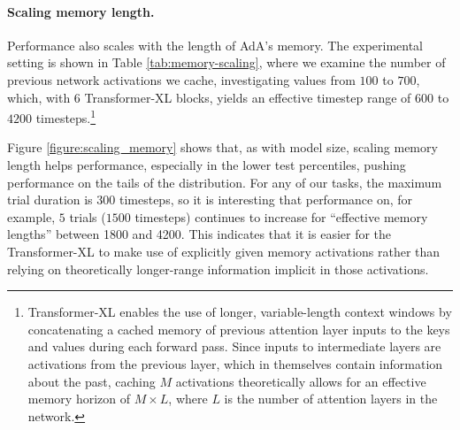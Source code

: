 \paragraph{Scaling memory length.}

Performance also scales with the length of AdA's memory. The experimental setting is shown in Table \ref{tab:memory-scaling}, where we examine the number of previous network activations we cache, investigating values from $100$ to $700$, which, with $6$ Transformer-XL blocks, yields an effective timestep range of $600$ to $4200$ timesteps.\footnote{Transformer-XL enables the use of longer, variable-length context windows by concatenating a cached memory of previous attention layer inputs to the keys and values during each forward pass. Since inputs to intermediate layers are activations from the previous layer, which in themselves contain information about the past, caching $M$ activations theoretically allows for an effective memory horizon of $M \times L$, where $L$ is the number of attention layers in the network. } 

Figure \ref{figure:scaling_memory} shows that, as with model size, scaling memory length helps performance, especially in the lower test percentiles, pushing performance on the tails of the distribution. For any of our tasks, the maximum trial duration is 300 timesteps, so it is interesting that performance on, for example, $5$ trials ($1500$ timesteps) continues to increase for ``effective memory lengths'' between 1800 and 4200. This indicates that it is easier for the Transformer-XL to make use of explicitly given memory activations rather than relying on theoretically longer-range information implicit in those activations. 

